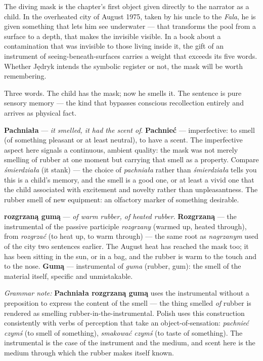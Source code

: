 \medskip
The diving mask is the chapter's first object given
directly to the narrator as a child. In the
overheated city of August 1975, taken by his uncle
to the \textit{Fala}, he is given something that
lets him see underwater --- that transforms the
pool from a surface to a depth, that makes the
invisible visible. In a book about a contamination
that was invisible to those living inside it,
the gift of an instrument of seeing-beneath-surfaces
carries a weight that exceeds its five words.
Whether Jędryk intends the symbolic register or
not, the mask will be worth remembering.



Three words. The child has the mask; now he smells
it. The sentence is pure sensory memory — the kind
that bypasses conscious recollection entirely and
arrives as physical fact.

\textbf{Pachniała} --- \textit{it smelled, it had
the scent of}. \textbf{Pachnieć} --- imperfective:
to smell (of something pleasant or at least
neutral), to have a scent. The imperfective aspect
here signals a continuous, ambient quality: the
mask was not merely smelling of rubber at one
moment but carrying that smell as a property.
Compare \textit{śmierdziała} (it stank) --- the
choice of \textit{pachniała} rather than
\textit{śmierdziała} tells you this is a child's
memory, and the smell is a good one, or at least
a vivid one that the child associated with
excitement and novelty rather than unpleasantness.
The rubber smell of new equipment: an olfactory
marker of something desirable.

\textbf{rozgrzaną gumą} --- \textit{of warm rubber,
of heated rubber}. \textbf{Rozgrzaną} --- the
instrumental of the passive participle
\textit{rozgrzany} (warmed up, heated through),
from \textit{rozgrzać} (to heat up, to warm
through) --- the same root as \textit{nagrzanym}
used of the city two sentences earlier. The August
heat has reached the mask too; it has been sitting
in the sun, or in a bag, and the rubber is warm
to the touch and to the nose. \textbf{Gumą} ---
instrumental of \textit{guma} (rubber, gum): the
smell of the material itself, specific and
unmistakable.

\medskip
\noindent\textit{Grammar note:} \textbf{Pachniała
rozgrzaną gumą} uses the instrumental without a
preposition to express the content of the smell ---
the thing smelled \textit{of} rubber is rendered as
smelling rubber-in-the-instrumental. Polish uses
this construction consistently with verbs of
perception that take an object-of-sensation:
\textit{pachnieć czymś} (to smell of something),
\textit{smakować czymś} (to taste of something).
The instrumental is the case of the instrument
and the medium, and scent here is the medium
through which the rubber makes itself known.

